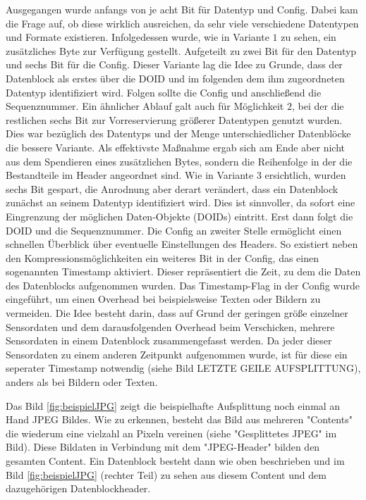 Ausgegangen wurde anfangs von je acht Bit für Datentyp und Config. Dabei kam die
Frage auf, ob diese wirklich ausreichen, da sehr viele verschiedene Datentypen
und Formate existieren. Infolgedessen wurde, wie in Variante $1$ zu sehen, ein
zusätzliches Byte zur Verfügung gestellt. Aufgeteilt zu zwei Bit für den
Datentyp und sechs Bit für die Config. Dieser Variante lag die Idee zu Grunde,
dass der Datenblock als erstes über die DOID und im folgenden dem ihm
zugeordneten Datentyp identifiziert wird. Folgen sollte die Config und
anschließend die Sequenznummer. Ein ähnlicher Ablauf galt auch für Möglichkeit
$2$, bei der die restlichen sechs Bit zur Vorreservierung größerer Datentypen
genutzt wurden. Dies war bezüglich des Datentyps und der Menge unterschiedlicher
Datenblöcke die bessere Variante.  Als effektivste Maßnahme
ergab sich am Ende aber nicht aus dem Spendieren eines zusätzlichen Bytes,
sondern die Reihenfolge in der die Bestandteile im Header angeordnet sind. Wie
in Variante $3$ ersichtlich, wurden sechs Bit gespart, die Anrodnung aber derart
verändert, dass ein Datenblock zunächst an seinem Datentyp identifiziert wird.
Dies ist sinnvoller, da sofort eine Eingrenzung der möglichen Daten-Objekte
(DOIDs) eintritt. Erst dann folgt die DOID und die Sequenznummer. Die Config
an zweiter Stelle ermöglicht einen schnellen Überblick über eventuelle
Einstellungen des Headers. So existiert neben den Kompressionsmöglichkeiten ein
weiteres Bit in der Config, das einen sogenannten Timestamp aktiviert. Dieser
repräsentiert die Zeit, zu dem die Daten des Datenblocks aufgenommen wurden. Das
Timestamp-Flag in der Config wurde eingeführt, um einen Overhead bei
beispielsweise Texten oder Bildern zu vermeiden. Die Idee besteht darin, dass
auf Grund der geringen größe einzelner Sensordaten und dem darausfolgenden
Overhead beim Verschicken, mehrere Sensordaten in einem Datenblock
zusammengefasst werden. Da jeder dieser Sensordaten zu einem anderen Zeitpunkt
aufgenommen wurde, ist für diese ein seperater Timestamp notwendig (siehe Bild
LETZTE GEILE AUFSPLITTUNG), anders als bei Bildern oder Texten. 



Das Bild \ref{fig:beispielJPG} zeigt die beispielhafte Aufsplittung noch einmal
an Hand JPEG Bildes. Wie zu erkennen, besteht das Bild aus mehreren "Contents"
die wiederum eine vielzahl an Pixeln vereinen (siehe "Gesplittetes JPEG" im
Bild). Diese Bildaten in Verbindung mit dem "JPEG-Header" bilden den gesamten
Content. Ein Datenblock besteht dann wie oben beschrieben und im Bild
\ref{fig:beispielJPG} (rechter Teil) zu sehen aus diesem Content und dem
dazugehörigen Datenblockheader.

